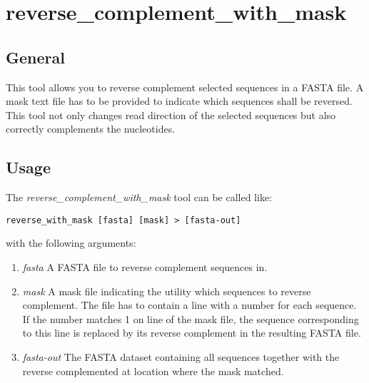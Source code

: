 \section{reverse\_complement\_with\_mask} \label{sec-revcomp}

\subsection{General}

This tool allows you to reverse complement selected sequences in a FASTA file.
A mask text file has to be provided to indicate which sequences shall
be reversed. This tool not only changes read direction of the
selected sequences but also correctly complements the nucleotides.

\subsection{Usage}

The \emph{reverse\_complement\_with\_mask} tool can be called like:
\begin{lstlisting}
reverse_with_mask [fasta] [mask] > [fasta-out]
\end{lstlisting}
with the following arguments:
\begin{enumerate}
  \item \emph{fasta} A FASTA file to reverse complement sequences in.
  \item \emph{mask} A mask file indicating the utility which sequences to
    reverse complement. The file has to contain a line with a number for each
    sequence. If the number matches 1 on line of the mask file, the
    sequence corresponding to this line is replaced by its reverse
    complement in the resulting FASTA file.
  \item \emph{fasta-out} The FASTA dataset containing all sequences
    together with the reverse complemented at location where the mask matched.
\end{enumerate}

